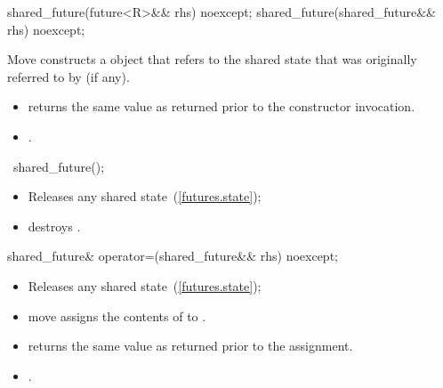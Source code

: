%
\begin{itemdecl}
shared_future(future<R>&& rhs) noexcept;
shared_future(shared_future&& rhs) noexcept;
\end{itemdecl}

\begin{itemdescr}
\pnum
\effects Move constructs a  object that refers to the
shared state that was originally referred to by  (if any).

\pnum
\postconditions
\begin{itemize}
\item {} returns the same value as  returned prior to
the constructor invocation.
\item {}.
\end{itemize}
\end{itemdescr}

%
\begin{itemdecl}
~shared_future();
\end{itemdecl}

\begin{itemdescr}
\pnum
\effects
\begin{itemize}
\item
Releases any shared state~(\ref{futures.state});
\item
destroys .
\end{itemize}
\end{itemdescr}

%
%
\begin{itemdecl}
shared_future& operator=(shared_future&& rhs) noexcept;
\end{itemdecl}

\begin{itemdescr}
\pnum
\effects
\begin{itemize}
\item
Releases any shared state~(\ref{futures.state});
\item
move assigns the contents of  to .
\end{itemize}

\pnum
\postconditions
\begin{itemize}
\item
{} returns the same value as  returned prior to
the assignment.

\item
{}.
\end{itemize}
\end{itemdescr}

